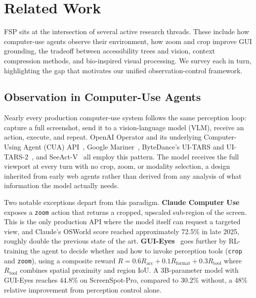 \documentclass[11pt,a4paper]{article}
\begin{document}

\section{Related Work}
\label{sec:related-work}

FSP sits at the intersection of several active research threads. These include how computer-use agents observe their environment, how zoom and crop improve GUI grounding, the tradeoff between accessibility trees and vision, context compression methods, and bio-inspired visual processing. We survey each in turn, highlighting the gap that motivates our unified observation-control framework.

\subsection{Observation in Computer-Use Agents}
\label{sec:rw-observation}

Nearly every production computer-use system follows the same perception loop: capture a full screenshot, send it to a vision-language model (VLM), receive an action, execute, and repeat. OpenAI Operator and its underlying Computer-Using Agent (CUA) API~\cite{openai-operator}, Google Mariner~\cite{google-mariner}, ByteDance's UI-TARS and UI-TARS-2~\cite{ui-tars,ui-tars-2}, and SeeAct-V~\cite{seeact-v} all employ this pattern. The model receives the full viewport at every turn with no crop, zoom, or modality selection, a design inherited from early web agents rather than derived from any analysis of what information the model actually needs.

Two notable exceptions depart from this paradigm. \textbf{Claude Computer Use}~\cite{claude-computer-use} exposes a \texttt{zoom} action that returns a cropped, upscaled sub-region of the screen. This is the only production API where the model itself can request a targeted view, and Claude's OSWorld score reached approximately 72.5\% in late 2025, roughly double the previous state of the art. \textbf{GUI-Eyes}~\cite{gui-eyes} goes further by RL-training the agent to decide whether and how to invoke perception tools (\texttt{crop} and \texttt{zoom}), using a composite reward $R = 0.6 R_\text{acc} + 0.1 R_\text{format} + 0.3 R_\text{tool}$ where $R_\text{tool}$ combines spatial proximity and region IoU. A 3B-parameter model with GUI-Eyes reaches 44.8\% on ScreenSpot-Pro, compared to 30.2\% without, a 48\% relative improvement from perception control alone.
\end{document}
